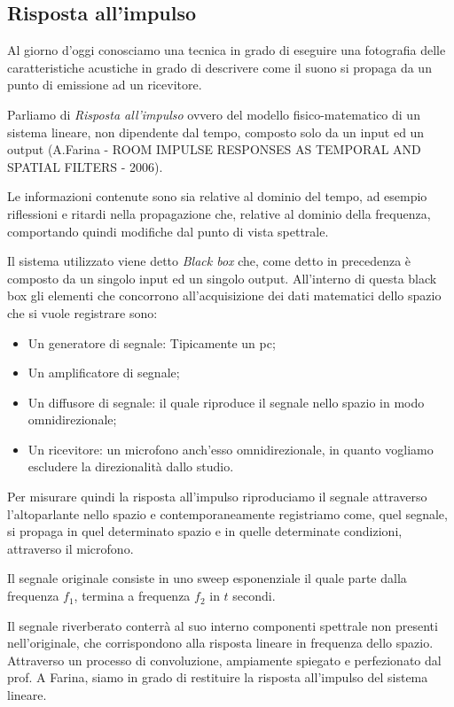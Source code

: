\subsection{Risposta all'impulso}
Al giorno d’oggi conosciamo una tecnica in grado di eseguire una fotografia delle caratteristiche acustiche in grado di descrivere come il suono si propaga da un punto di emissione ad un ricevitore.

Parliamo di \textit{Risposta all’impulso} ovvero del modello fisico-matematico di un sistema lineare, non dipendente dal tempo, composto solo da un input ed un output (A.Farina - ROOM IMPULSE RESPONSES AS TEMPORAL AND SPATIAL FILTERS - 2006).

Le informazioni contenute sono sia relative al dominio del tempo, ad esempio riflessioni e ritardi nella propagazione che, relative al dominio della frequenza, comportando quindi modifiche dal punto di vista spettrale.

Il sistema utilizzato viene detto \textit{Black box} che, come detto in precedenza è composto da un singolo input ed un singolo output. All’interno di questa black box gli elementi che concorrono all’acquisizione dei dati matematici dello spazio che si vuole registrare sono:
\begin{itemize}
\item Un generatore di segnale: Tipicamente un pc;
\item Un amplificatore di segnale;
\item Un diffusore di segnale: il quale riproduce il segnale nello spazio in modo omnidirezionale;
\item Un ricevitore: un microfono anch’esso omnidirezionale, in quanto vogliamo escludere la direzionalità dallo studio.
\end{itemize}
Per misurare quindi la risposta all'impulso riproduciamo il segnale attraverso l’altoparlante nello spazio e contemporaneamente registriamo come, quel segnale, si propaga in quel determinato spazio e in quelle determinate condizioni, attraverso il microfono.

Il segnale originale consiste in uno sweep esponenziale il quale parte dalla frequenza $f_1$, termina a frequenza $f_2$ in $t$ secondi.

Il segnale riverberato conterrà al suo interno componenti spettrale non presenti nell’originale, che corrispondono alla risposta lineare in frequenza dello spazio.
Attraverso un processo di convoluzione, ampiamente spiegato e perfezionato dal prof. A Farina, siamo in grado di restituire la risposta all'impulso del sistema lineare.

